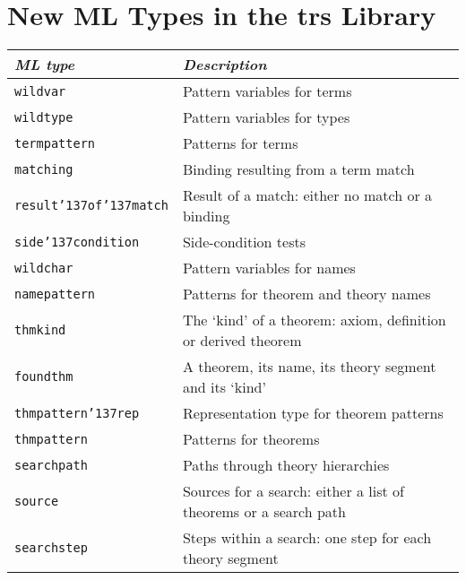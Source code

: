 






\chapter{New ML Types in the trs Library}

{\def\_{{\char'137}}                     %

\begin{center}
\begin{tabular}{|l|l|}
\hline
{\it ML type}                 & {\it Description}\\
\hline
{\small\tt wildvar}           & Pattern variables for terms \\
{\small\tt wildtype}          & Pattern variables for types \\
{\small\tt termpattern}       & Patterns for terms \\
{\small\tt matching}          & Binding resulting from a term match \\
{\small\tt result\_of\_match} & Result of a match: either no match or a
binding \\
{\small\tt side\_condition}   & Side-condition tests \\
{\small\tt wildchar}          & Pattern variables for names \\
{\small\tt namepattern}       & Patterns for theorem and theory names \\
{\small\tt thmkind}           & The `kind' of a theorem: axiom, definition or
derived theorem \\
{\small\tt foundthm}          & A theorem, its name, its theory segment and its
`kind' \\
{\small\tt thmpattern\_rep}   & Representation type for theorem patterns \\
{\small\tt thmpattern}        & Patterns for theorems \\
{\small\tt searchpath}        & Paths through theory hierarchies \\
{\small\tt source}            & Sources for a search: either a list of theorems
or a search path \\
{\small\tt searchstep}        & Steps within a search: one step for each theory
segment \\
\hline
\end{tabular}
\end{center}

}
